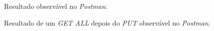 \begin{figure}[h]
	\begin{center}
	\end{center}
	\caption{Resultado observável no \emph{Postman}.}\label{fig:eventput}
\end{figure}
\newpage
\begin{figure}[h]
	\begin{center}
	\end{center}
	\caption{Resultado de um \emph{GET ALL} depois do \emph{PUT} observável no \emph{Postman}.}\label{fig:eventallafterput}
\end{figure}
\newpage

